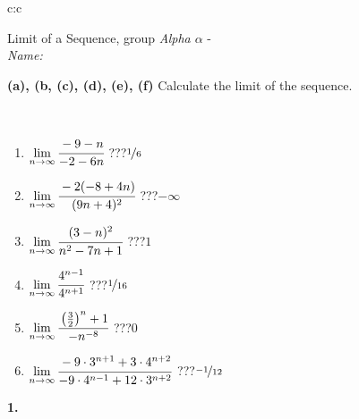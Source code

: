 \documentclass[10pt]{report}
\begin{document}
\thispagestyle{empty}
\begin{tabular}{c:c}
\begin{minipage}[c][104.5mm][t]{0.5\linewidth}
\begin{center}
\vspace{5mm}
{\huge Limit of a Sequence, group \textit{Alpha $\alpha$} -}\\[5mm]
\textit{Name:}\phantom{xxxxxxxxxxxxxxxxxxxxxxxxxxxxxxxxxxxxxxxxxxxxxxxxxxxxxxxxxxxxxxxxx}\\[5mm]
\begin{minipage}{0.95\linewidth}
\begin{center}
{
\textbf{(a), (b, (c), (d), (e), (f)} Calculate the limit of the sequence. \\[-1mm]
\phantom{x}
}
\end{center}
\end{minipage}
\\[1mm]
\begin{minipage}{0.79\linewidth}
\begin{center}
\begin{varwidth}{\linewidth}
\setlength{\itemsep}{0pt}
\begin{enumerate}
\normalsize
\item $\lim\limits_{n\to\infty}\cfrac{-9-n}{-2-6n}$\quad \dotfill\; ???\;\dotfill \quad $\nicefrac{1}{6}$
\item $\lim\limits_{n\to\infty}\cfrac{-2(-8+4n)}{(9n+4)^2}$\quad \dotfill\; ???\;\dotfill \quad $-\infty$
\item $\lim\limits_{n\to\infty}\cfrac{(3-n)^2}{n^2-7n+1}$\quad \dotfill\; ???\;\dotfill \quad $1$
\item $\lim\limits_{n\to\infty}\cfrac{4^{n-1}}{4^{n+1}}$\quad \dotfill\; ???\;\dotfill \quad $\nicefrac{1}{16}$
\item $\lim\limits_{n\to\infty}\cfrac{\left(\frac{3}{2}\right)^n +1}{-n^{-8}}$\quad \dotfill\; ???\;\dotfill \quad $0$
\item $\lim\limits_{n\to\infty}\cfrac{-9\cdot 3^{n+1}+3\cdot 4^{n+2}}{-9\cdot 4^{n-1}+12\cdot 3^{n+2}}$\quad \dotfill\; ???\;\dotfill \quad $\nicefrac{-1}{12}$
\end{enumerate}
\end{varwidth}
\end{center}
\end{minipage}
\begin{minipage}{0.20\linewidth}
\begin{center}
{\Huge\bfseries 1.} \\[2mm]

\end{center}
\end{minipage}
\end{center}
\end{minipage}
\end{tabular}
\end{document}
